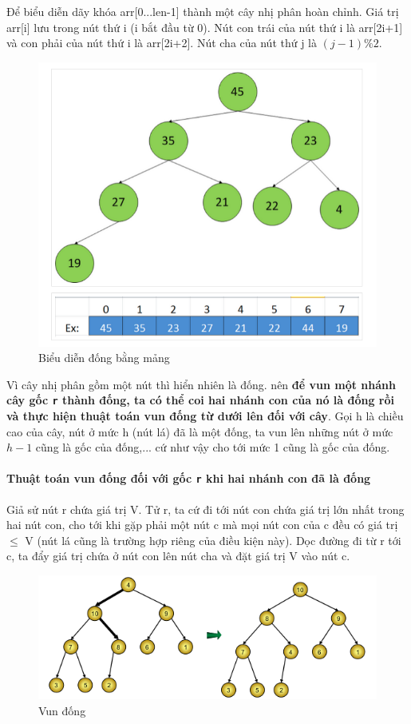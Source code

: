 \documentclass[a4paper,12pt]{report}
\begin{document}
Để biểu diễn dãy khóa arr[0...len-1] thành một cây nhị phân hoàn chỉnh. Giá trị arr[i] lưu trong nút thứ i (i bắt đầu từ 0). Nút con trái của nút thứ i là arr[2i+1] và con phải của nút thứ i là arr[2i+2]. Nút cha của nút thứ j là $(j-1) \% 2$.
\begin{figure}[htp]
\centering
\includegraphics[scale=0.40]{img/bddong.png}
\caption{Biểu diễn đống bằng mảng}
\label{mangdong}
\end{figure}

Vì cây nhị phân gồm một nút thì hiển nhiên là đống. nên \textbf{để vun một nhánh cây gốc \texttt{r} thành đống, ta có thể coi hai nhánh con của nó là đống rồi và thực hiện thuật toán vun đống từ dưới lên đối với cây}. Gọi h là chiều cao của cây, nút ở mức h (nút lá) đã là một đống, ta vun lên những nút ở mức $h-1$ cũng là gốc của đống,... cứ như vậy cho tới mức 1 cũng là gốc của đống.

\paragraph{Thuật toán vun đống đối với gốc \texttt{r} khi hai nhánh con đã là đống}
Giả sử nút r chứa giá trị V. Tử r, ta cứ đi tới nút con chứa giá trị lớn nhất trong hai nút con, cho tới khi gặp phải một nút c mà mọi nút con của c đều có giá trị $ \le $ V (nút lá cũng là trường hợp riêng của điều kiện này). Dọc đường đi từ r tới c, ta đẩy giá trị chứa ở nút con lên nút cha và đặt giá trị V vào nút c.
\begin{figure}[htp]
\centering
\includegraphics[scale=0.50]{img/buildheap.png}
\caption{Vun đống}
\label{}
\end{figure}
\end{document}
